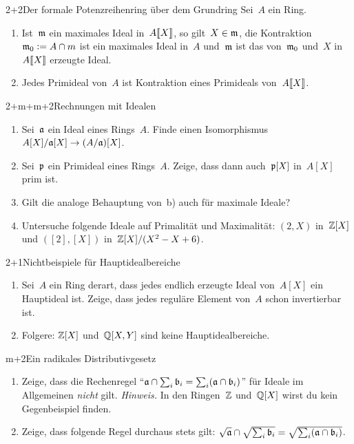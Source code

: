 \documentclass{uebblatt}
\begin{document}

\begin{aufgabe}{2+2}{Der formale Potenzreihenring über dem Grundring}
Sei~$A$ ein Ring.
\begin{enumerate}
\item Ist~$\mathfrak{m}$ ein maximales Ideal in~${A}\llbracket{X}\rrbracket$, so gilt~$X \in \mathfrak{m}$, die
Kontraktion~$\mathfrak{m}_0 \vcentcolon= A \cap m$ ist ein maximales Ideal in~$A$ und~$\mathfrak{m}$
ist das von~$\mathfrak{m}_0$ und~$X$ in~${A}\llbracket{X}\rrbracket$ erzeugte Ideal.
\item Jedes Primideal von~$A$ ist Kontraktion eines Primideals von~${A}\llbracket{X}\rrbracket$.
\end{enumerate}
\end{aufgabe}

\begin{aufgabe}{2+m+m+2}{Rechnungen mit Idealen}
\begin{enumerate}
\item Sei~$\mathfrak{a}$ ein Ideal eines Rings~$A$. Finde einen
Isomorphismus~$A[X]/\mathfrak{a}[X] \to (A/\mathfrak{a})[X]$.
\item Sei~$\mathfrak{p}$ ein Primideal eines Rings~$A$. Zeige, dass dann auch~$\mathfrak{p}[X]$
in~$A[X]$ prim ist.
\item Gilt die analoge Behauptung von~b) auch für maximale Ideale?
\item Untersuche folgende Ideale auf Primalität und Maximalität:
$(2, X)$ in~$\mathbb{Z}[X]$ und $([2], [X])$ in~$\mathbb{Z}[X]/(X^2 - X + 6)$.
\end{enumerate}
\end{aufgabe}

\begin{aufgabe}{2+1}{Nichtbeispiele für Hauptidealbereiche}
\begin{enumerate}
\item Sei~$A$ ein Ring derart, dass jedes endlich erzeugte Ideal von~$A[X]$ ein
Hauptideal ist. Zeige, dass jedes reguläre Element von~$A$ schon invertierbar
ist.
\item Folgere: $\mathbb{Z}[X]$ und~$\mathbb{Q}[X,Y]$ sind keine Hauptidealbereiche.
\end{enumerate}
\end{aufgabe}

\begin{aufgabe}{m+2}{Ein radikales Distributivgesetz}
\begin{enumerate}
\item Zeige, dass die Rechenregel
"`$\mathfrak{a} \cap \sum_i \mathfrak{b}_i = \sum_i (\mathfrak{a} \cap \mathfrak{b}_i)$"'
für Ideale im Allgemeinen \emph{nicht} gilt. \emph{Hinweis.} In den
Ringen~$\mathbb{Z}$ und~$\mathbb{Q}[X]$ wirst du kein Gegenbeispiel finden.
\item Zeige, dass folgende Regel durchaus stets gilt:
$\sqrt{\mathfrak{a}} \cap \sqrt{\sum_i \mathfrak{b}_i} = \sqrt{\sum_i (\mathfrak{a} \cap \mathfrak{b}_i)}$.
\end{enumerate}
\end{aufgabe}
\end{document}
